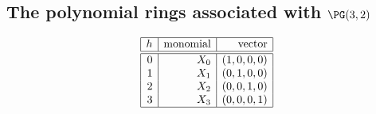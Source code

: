 \subsection*{The polynomial rings associated with ${\rm \PG}(3,2)$}
$$
\begin{array}{|r|r|r|}
\hline
h &  \mbox{monomial} & \mbox{vector} \\
\hline
\hline
0 & X_0 & ( 1, 0, 0, 0 )\\
1 & X_1 & ( 0, 1, 0, 0 )\\
2 & X_2 & ( 0, 0, 1, 0 )\\
3 & X_3 & ( 0, 0, 0, 1 )\\
\hline
\end{array}
$$

